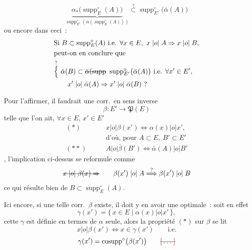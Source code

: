 \documentclass[11pt,a4paper]{article}
\begin{document}
\[ \underbrace{\alpha_{*}\bigl(\operatorname{supp}^{\circ}_{E}(A)\bigr)}_{\operatorname{supp}^{\circ}_{E'}(\bar\alpha(\operatorname{supp}^{\circ}_{E}(A)))} \overset{?}{\subset} \operatorname{supp}^{\circ}_{E'}\bigl(\bar\alpha(A)\bigr) \]
ou encore dans ceci~:
\begin{align*}
&\text{Si } B \subset \operatorname{supp}^{\circ}_{E}(A) \text{ i.e. } \forall x \in E,\ x \mathrel{|o|} A \Rightarrow x \mathrel{|o|} B, \\
&\text{peut-on en conclure que} \\
&\overset{?}{\Bigl\{}\ \bar\alpha(B) \subset \text{\struck{$\bar\alpha(\operatorname{supp}$}}\ \operatorname{supp}^{\circ}_{E'}\bigl(\bar\alpha(A)\bigr) \text{ i.e. } \forall x' \in E', \\
&\qquad x' \mathrel{|o|} \bar\alpha(A) \Rightarrow x' \mathrel{|o|} \bar\alpha(B)~?
\end{align*}

Pour l'affirmer, il faudrait une corr.\ en sens inverse
\[ \beta : E' \longrightarrow \mathfrak{P}(E) \]
telle que l'on ait, $\forall x \in E$, $x' \in E'$
\begin{align*}
(*) \qquad & x \mathrel{|o|} \beta(x') \Longleftrightarrow \alpha(x) \mathrel{|o|} x', \\
&\text{d'où, pour } A \subset E,\ B' \subset E' \\
(**) \qquad & A \mathrel{|o|} \bar\beta(B') \Longleftrightarrow \bar\alpha(A) \mathrel{|o|} B'
\end{align*}
, l'implication ci-dessus se \struck{\ill{}} reformule comme
\[ \text{\struck{$x \mathrel{|o|} \beta(x) \Rightarrow$}} \qquad \beta(x') \mathrel{|o|} A \overset{?}{\Longrightarrow} \beta(x') \mathrel{|o|} B \]
ce qui résulte bien de $B \subset \operatorname{supp}^{\circ}_{E}(A)$.

Ici encore, si une telle corr.\ $\beta$ existe, il doit y en avoir une optimale~: soit en effet
\[ \gamma(x') = \{\, x \in E \mid \alpha(x) \mathrel{|o|} x' \,\}, \]
cette $\gamma$ est définie en termes de $\alpha$ seule, alors la propriété $(*)$ sur $\beta$ se lit
\[ x \mathrel{|o|} \beta(x') \Longleftrightarrow x \in \gamma(x') \qquad \text{i.e.} \]
\[ \gamma(x') = \operatorname{cosupp}^{\circ}\bigl(\beta(x')\bigr) \qquad \text{\struck{\ill{}}} \]
\end{document}
